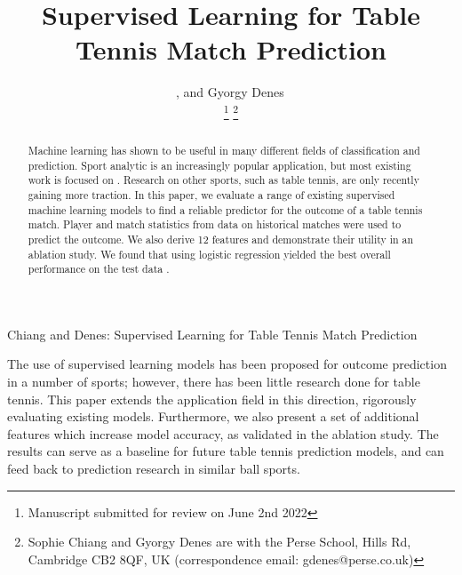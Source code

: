 \documentclass[journal]{IEEEtai}
\begin{document}
\title{Supervised Learning for Table Tennis Match Prediction}
\author{, and
    Gyorgy Denes\,

\thanks{Manuscript submitted for review on  June 2nd 2022} 
\thanks{Sophie Chiang and Gyorgy Denes are with the Perse School, Hills Rd, Cambridge CB2 8QF, UK (correspondence email: gdenes@perse.co.uk)}
}

{Chiang and Denes: Supervised Learning for Table Tennis Match Prediction}



\maketitle


\begin{abstract}
Machine learning has shown to be useful in many different fields of classification and prediction. Sport analytic is an increasingly popular application, but most existing work is focused on . Research on other sports, such as table tennis, are only recently gaining more traction. In this paper, we evaluate a range of existing supervised machine learning models to find a reliable predictor for the outcome of a table tennis match. Player and match statistics from data on historical matches were used to predict the outcome. We also derive 12 features and demonstrate their utility in an ablation study. We found that using logistic regression yielded the best overall performance on the test data .
\end{abstract}

\begin{IEEEImpStatement}
The use of supervised learning models has been proposed for outcome prediction in a number of sports; however, there has been little research done for table tennis. This paper extends the application field in this direction, rigorously evaluating existing models. Furthermore, we also present a set of additional features which increase model accuracy, as validated in the ablation study. The results can serve as a baseline for future table tennis prediction models, and can feed back to prediction research in similar ball sports.
\end{IEEEImpStatement}
\end{document}
